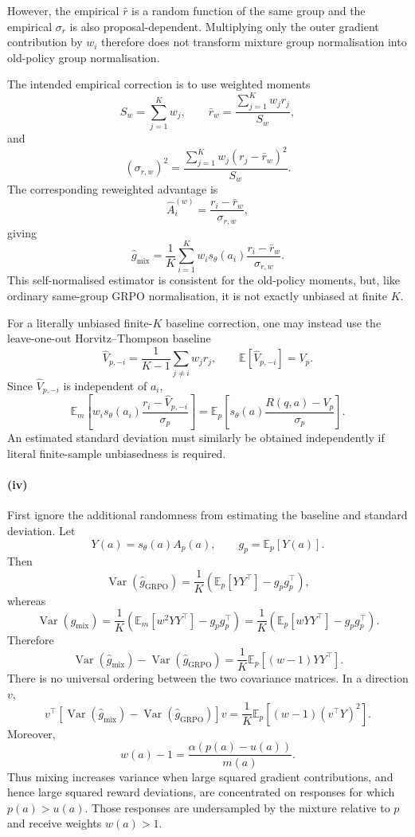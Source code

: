 However, the empirical $\bar r$ is a random function of the same group and the
empirical $\sigma_r$ is also proposal-dependent. Multiplying only the outer
gradient contribution by $w_i$ therefore does not transform mixture group
normalisation into old-policy group normalisation.

The intended empirical correction is to use weighted moments
\[
S_w=\sum_{j=1}^K w_j,
\qquad
\bar r_w
=
\frac{\sum_{j=1}^K w_jr_j}{S_w},
\]
and
\[
(\sigma_{r,w})^2
=
\frac{
\sum_{j=1}^K w_j(r_j-\bar r_w)^2
}{
S_w
}.
\]
The corresponding reweighted advantage is
\[
\boxed{
\hat A_i^{(w)}
=
\frac{r_i-\bar r_w}{\sigma_{r,w}},
}
\]
giving
\[
\boxed{
\hat g_{\mathrm{mix}}
=
\frac{1}{K}
\sum_{i=1}^K
w_i s_\theta(a_i)
\frac{r_i-\bar r_w}{\sigma_{r,w}}.
}
\]
This self-normalised estimator is consistent for the old-policy moments, but,
like ordinary same-group GRPO normalisation, it is not exactly unbiased at
finite $K$.

For a literally unbiased finite-$K$ baseline correction, one may instead use
the leave-one-out Horvitz--Thompson baseline
\[
\hat V_{p,-i}
=
\frac{1}{K-1}
\sum_{j\neq i}w_jr_j,
\qquad
\mathbb{E}[\hat V_{p,-i}]=V_p.
\]
Since $\hat V_{p,-i}$ is independent of $a_i$,
\[
\mathbb{E}_{m}
\left[
w_i s_\theta(a_i)
\frac{r_i-\hat V_{p,-i}}{\sigma_p}
\right]
=
\mathbb{E}_{p}
\left[
s_\theta(a)
\frac{R(q,a)-V_p}{\sigma_p}
\right].
\]
An estimated standard deviation must similarly be obtained independently if
literal finite-sample unbiasedness is required.

\paragraph{(iv)}
First ignore the additional randomness from estimating the baseline and
standard deviation. Let
\[
Y(a)=s_\theta(a)A_p(a),
\qquad
g_p=\mathbb{E}_{p}[Y(a)].
\]
Then
\[
\operatorname{Var}(\hat g_{\mathrm{GRPO}})
=
\frac{1}{K}
\left(
\mathbb{E}_{p}[YY^\top]-g_pg_p^\top
\right),
\]
whereas
\[
\operatorname{Var}(\hat g_{\mathrm{mix}})
=
\frac{1}{K}
\left(
\mathbb{E}_{m}[w^2YY^\top]-g_pg_p^\top
\right)
=
\frac{1}{K}
\left(
\mathbb{E}_{p}[wYY^\top]-g_pg_p^\top
\right).
\]
Therefore
\[
\boxed{
\operatorname{Var}(\hat g_{\mathrm{mix}})
-
\operatorname{Var}(\hat g_{\mathrm{GRPO}})
=
\frac{1}{K}
\mathbb{E}_{p}
\left[
(w-1)YY^\top
\right].
}
\]
There is no universal ordering between the two covariance matrices. In a
direction $v$,
\[
v^\top
\left[
\operatorname{Var}(\hat g_{\mathrm{mix}})
-
\operatorname{Var}(\hat g_{\mathrm{GRPO}})
\right]v
=
\frac{1}{K}
\mathbb{E}_{p}
\left[
(w-1)(v^\top Y)^2
\right].
\]
Moreover,
\[
w(a)-1
=
\frac{\alpha(p(a)-u(a))}{m(a)}.
\]
Thus mixing increases variance when large squared gradient contributions,
and hence large squared reward deviations, are concentrated on responses for
which $p(a)>u(a)$. Those responses are undersampled by the mixture relative to
$p$ and receive weights $w(a)>1$.

